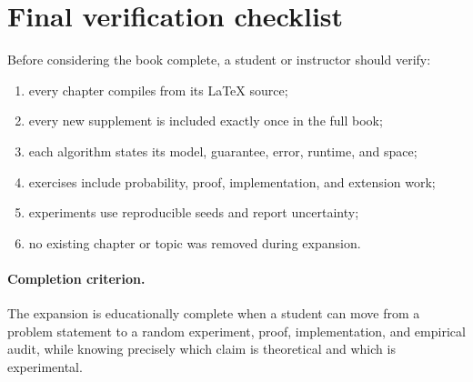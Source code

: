 \section{Final verification checklist}

Before considering the book complete, a student or instructor should verify:
\begin{enumerate}
\item every chapter compiles from its LaTeX source;
\item every new supplement is included exactly once in the full book;
\item each algorithm states its model, guarantee, error, runtime, and space;
\item exercises include probability, proof, implementation, and extension work;
\item experiments use reproducible seeds and report uncertainty;
\item no existing chapter or topic was removed during expansion.
\end{enumerate}

\paragraph{Completion criterion.}
The expansion is educationally complete when a student can move from a
problem statement to a random experiment, proof, implementation, and
empirical audit, while knowing precisely which claim is theoretical and which
is experimental.
